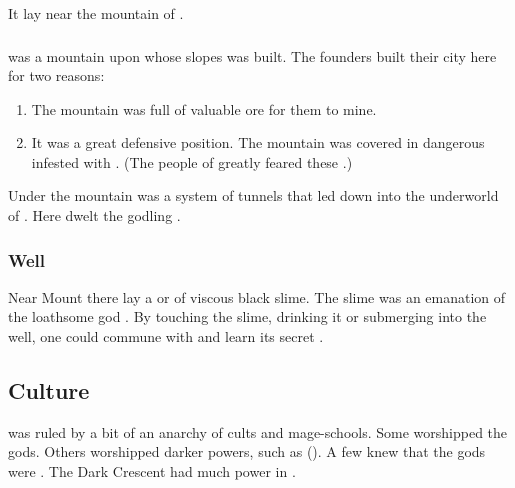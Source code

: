 It lay near the mountain of .





\subsubsection{\Shrun}
\index{\Shrun}
\Shrun was a mountain upon whose slopes \Yormis was built.
The founders built their city here for two reasons:
\begin{enumerate}
  \item 
    The mountain was full of valuable ore for them to mine.
  \item 
    It was a great defensive position. 
    The mountain was covered in dangerous \wylde infested with . 
    (The people of \Yormis greatly feared these \werlocs.)
\end{enumerate}


Under the mountain was a system of tunnels that led down into the underworld of . 
Here dwelt the \xs godling .





\subsubsection{Well}
Near Mount \Shrun there lay a  or  of viscous black slime. 
The slime was an emanation of the loathsome god . 
By touching the slime, drinking it or submerging into the well, one could commune with \Ubloth and learn its secret \arcana. 










\subsection{Culture}
\Yormis was ruled by a bit of an anarchy of cults and mage-schools.
Some worshipped the \Ortaican gods.
Others worshipped darker powers, such as \Ubloth ().
A few knew that the \Ortaican gods were \xss.
The Dark Crescent had much power in \Yormis.









